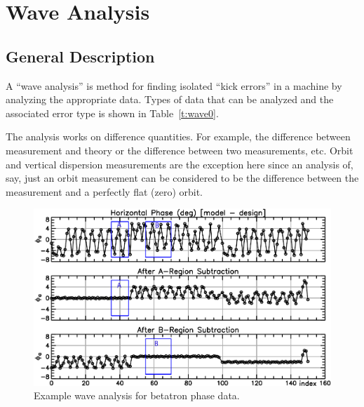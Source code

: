 \chapter{Wave Analysis}
\label{c:wave}

\section{General Description}
\label{s:wave.general}

A ``wave analysis'' is method for finding isolated ``kick errors'' in a machine by analyzing the
appropriate data. Types of data that can be analyzed and the associated error type is shown in
Table~\ref{t:wave0}.

The analysis works on difference quantities. For example, the difference between measurement and
theory or the difference between two measurements, etc. Orbit and vertical dispersion measurements
are the exception here since an analysis of, say, just an orbit measurement can be considered to be
the difference between the measurement and a perfectly flat (zero) orbit.

\begin{table}[h]
\caption[Wave measurement types.]  {Types of measurements that can be used in a wave analysis and
the types of errors that can be diagnosed.}  
\label{t:wave0}
\end{table}

\begin{figure}[t]
  \centering
  \includegraphics[width=6in]{wave.pdf}
  \caption[Example wave analysis.]
{Example wave analysis for betatron phase data.}
  \label{f:wave}
\end{figure}

